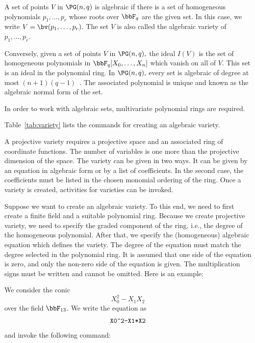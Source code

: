 A set of points $V$ in $\PG(n,q)$ is algebraic if there is a set 
of homogeneous polynomials $p_1,\ldots,p_r$
whose roots over $\bbF_q$ are the given set. 
In this case, we write $V = \bv(p_1,\ldots,p_r).$ 
The set $V$ is also called the algebraic variety of $p_1,\ldots,p_r.$

\bigskip

Conversely, given a set of points $V$ in $\PG(n,q),$ 
the ideal $I(V)$ is the set of homogeneous polynomials 
in $\bbF_q[X_0,\ldots,X_n]$ which vanish on all of $V.$
This set is an ideal in the polynomial ring. 
In $\PG(n,q),$ every set is algebraic 
of degree at most $(n+1)(q-1)$~\cite{GlynnHirschfeld95}. 
The associated polynomial is unique and known as 
the algebraic normal form of the set.


\bigskip


In order to work with algebraic sets, 
multivariate polynomial rings are required. 


\bigskip


Table~\ref{tab:variety} lists the commands 
for creating an algebraic variety.



\bigskip


A projective variety requires a projective space 
and an associated ring of coordinate functions.
The number of variables is one more than the projective dimension of the space.
The variety can be given in two ways. 
It can be given by an equation in algebraic form or 
by a list of coefficients. 
In the second case, the coefficients must be listed in the chosen monomial ordering of the ring.
Once a variety is created, activities for varieties can be invoked. 


\bigskip

Suppose we want to create an algebraic variety. 
To this end, we need to first create a finite field and a suitable polynomial ring. 
Because we create projective variety, 
we need to specify the graded component of the ring, i.e., 
the degree of the homogeneous polynomial. 
After that, we specify the (homogeneous) algebraic equation which defines the variety. 
The degree of the equation must match the degree selected in the polynomial ring.
It is assumed that one side of the equation is zero, 
and only the non-zero side of the equation is given.
The multiplication signs must be written and cannot be omitted.
Here is an example:


\bigskip

We consider the conic 
$$
X_0^2-X_1X_2
$$
over the field $
\bbF_{13}$.
We write the equation as 
$$
\verb'X0^2-X1*X2'
$$
and invoke the following command:


